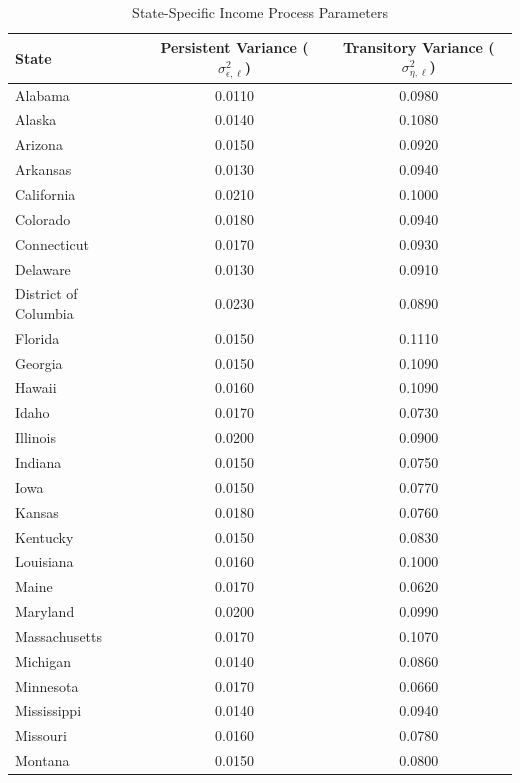 \begin{table}[H]
    \centering
    \footnotesize
    \renewcommand{\arraystretch}{0.85}
    \caption{State-Specific Income Process Parameters}
    \label{tab:state_income_process}
    \begin{tabular}{lcc}
        \toprule
        \textbf{State} & \textbf{Persistent Variance} ($\sigma_{\epsilon,\ell}^2$) & \textbf{Transitory Variance} ($\sigma_{\eta,\ell}^2$) \\
        \midrule
        Alabama & 0.0110 & 0.0980 \\
        Alaska & 0.0140 & 0.1080 \\
        Arizona & 0.0150 & 0.0920 \\
        Arkansas & 0.0130 & 0.0940 \\
        California & 0.0210 & 0.1000 \\
        Colorado & 0.0180 & 0.0940 \\
        Connecticut & 0.0170 & 0.0930 \\
        Delaware & 0.0130 & 0.0910 \\
        District of Columbia & 0.0230 & 0.0890 \\
        Florida & 0.0150 & 0.1110 \\
        Georgia & 0.0150 & 0.1090 \\
        Hawaii & 0.0160 & 0.1090 \\
        Idaho & 0.0170 & 0.0730 \\
        Illinois & 0.0200 & 0.0900 \\
        Indiana & 0.0150 & 0.0750 \\
        Iowa & 0.0150 & 0.0770 \\
        Kansas & 0.0180 & 0.0760 \\
        Kentucky & 0.0150 & 0.0830 \\
        Louisiana & 0.0160 & 0.1000 \\
        Maine & 0.0170 & 0.0620 \\
        Maryland & 0.0200 & 0.0990 \\
        Massachusetts & 0.0170 & 0.1070 \\
        Michigan & 0.0140 & 0.0860 \\
        Minnesota & 0.0170 & 0.0660 \\
        Mississippi & 0.0140 & 0.0940 \\
        Missouri & 0.0160 & 0.0780 \\
        Montana & 0.0150 & 0.0800 \\

\end{tabular}
\end{table}
